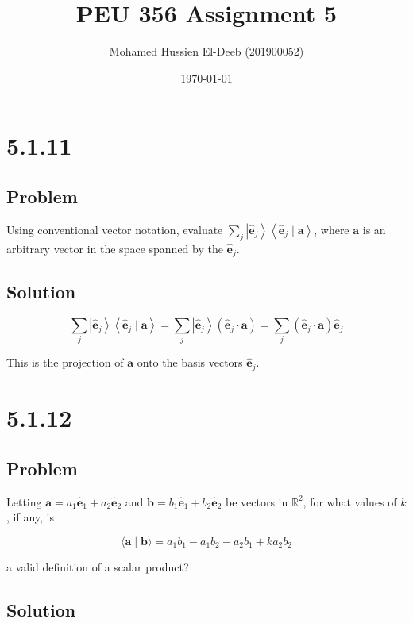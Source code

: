\documentclass[12pt]{article}
\title{PEU 356 Assignment 5}
\author{Mohamed Hussien El-Deeb (201900052)}
\date{\today}
\begin{document}
\maketitle
\tableofcontents
\hypersetup{linkcolor=RoyalBlue4}

\newpage
\section{5.1.11}

\subsection{Problem}

Using conventional vector notation, evaluate \(\sum_j\left|\hat{\mathbf{e}}_j\right\rangle\left\langle\hat{\mathbf{e}}_j \mid \mathbf{a}\right\rangle \), where \(\mathbf{a}\) is an arbitrary vector in the space spanned by the \(\hat{\mathbf{e}}_j\).

\subsection{Solution}

\[
    \sum_j\left|\hat{\mathbf{e}}_j\right\rangle\left\langle\hat{\mathbf{e}}_j \mid \mathbf{a}\right\rangle=\sum_j\left|\hat{\mathbf{e}}_j\right\rangle\left(\hat{\mathbf{e}}_j \cdot \mathbf{a}\right)=\sum_j\left(\hat{\mathbf{e}}_j \cdot \mathbf{a}\right)\hat{\mathbf{e}}_j
\]

This is the projection of \(\mathbf{a}\) onto the basis vectors \(\hat{\mathbf{e}}_j\).

\newpage
\section{5.1.12}

\subsection{Problem}

Letting \(\mathbf{a}=a_1 \hat{\mathbf{e}}_1+a_2 \hat{\mathbf{e}}_2\) and \(\mathbf{b}=b_1 \hat{\mathbf{e}}_1+b_2 \hat{\mathbf{e}}_2\) be vectors in \(\mathbb{R}^2\), for what values of \(k\), if any, is

\[
    \langle\mathbf{a} \mid \mathbf{b}\rangle=a_1 b_1-a_1 b_2-a_2 b_1+k a_2 b_2
\]

a valid definition of a scalar product?

\subsection{Solution}
\end{document}
